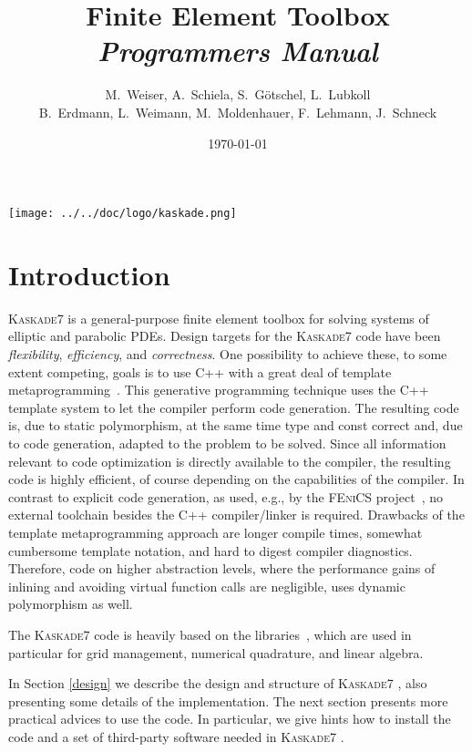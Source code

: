 \documentclass[11pt]{article}
\title{\K Finite Element Toolbox \\ {\em Programmers Manual} }
\author{M.~Weiser, A.~Schiela, S.~G\"otschel, L.~Lubkoll \\B.~Erdmann, L.~Weimann, M.~Moldenhauer, F.~Lehmann, J.~Schneck} \date{\today}
\newcommand{\K}{\textsc{Kaskade7 }}
\begin{document}
\maketitle
\vspace{8cm}
\centerline{\texttt{[image: ../../doc/logo/kaskade.png]}}

\newpage
\tableofcontents
\newpage

\pagestyle{myheadings}
\thispagestyle{plain}

\section{Introduction}  \label{intro}
\K is a general-purpose finite element toolbox for solving systems of elliptic and parabolic PDEs. Design targets for the \K code have been \emph{flexibility}, \emph{efficiency}, and \emph{correctness}.   One possibility to achieve these, to some extent competing, goals is to use C++ with a great deal of template metaprogramming~\cite{Veldhuizen1995}. This generative programming technique uses the C++ template system to let the compiler perform code generation. The resulting code is, due to static polymorphism, at the same time type and const correct and, due to code generation, adapted to the problem to be solved. Since all information relevant to  code optimization is directly available to the compiler, the resulting code is highly efficient, of course depending on the capabilities of the compiler. In contrast to explicit code generation, as used, e.g., by the \textsc{FEniCS} project~\cite{Logg2007}, no external toolchain besides the C++ compiler/linker is required. Drawbacks of the template 
metaprogramming approach are longer compile times, somewhat cumbersome template notation, and hard to digest compiler diagnostics. Therefore, code on higher abstraction levels, where the performance gains of inlining and avoiding virtual function calls are negligible, uses dynamic polymorphism as well.

The \K code is heavily based on the \dune {} libraries~\cite{BastianBlattDednerEngwerKloefkornOhlbergerSander2008,BastianBlattDednerEngwerKloefkornKornhuberOhlbergerSander2008,BlattBastian2007,dune}, which are used in particular for grid management, numerical quadrature, and linear algebra.


In Section \ref{design} we describe the design and structure of \K, also presenting some details of the implementation.
The next section presents more practical advices to use the code. In particular, we give hints how to install the code and
a set of third-party software needed in \K. 
\end{document}
